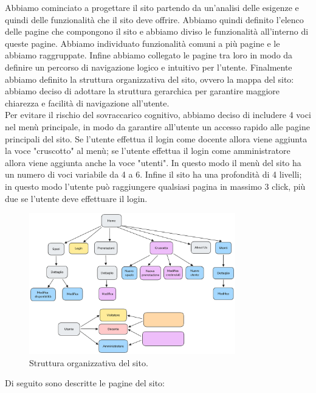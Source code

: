 Abbiamo cominciato a progettare il sito partendo da un'analisi delle esigenze e
quindi delle funzionalità che il sito deve offrire. Abbiamo quindi definito
l'elenco delle pagine che compongono il sito e abbiamo diviso le funzionalità
all'interno di queste pagine.
Abbiamo individuato funzionalità comuni a più pagine e le abbiamo raggruppate.
Infine abbiamo collegato le pagine tra loro in modo da definire un percorso
di navigazione logico e intuitivo per l'utente.
Finalmente abbiamo definito la struttura organizzativa del sito, ovvero la
mappa del sito: abbiamo deciso di adottare la struttura gerarchica per garantire
maggiore chiarezza e facilità di navigazione all'utente.\\
Per evitare il rischio del sovraccarico cognitivo, abbiamo deciso di includere 4
voci nel menù principale, in modo da garantire all'utente un accesso rapido alle
pagine principali del sito. Se l'utente effettua il login come docente allora
viene aggiunta la voce "cruscotto" al menù; se l'utente effettua il login come
amministratore allora viene aggiunta anche la voce "utenti". In questo modo il
menù del sito ha un numero di voci variabile da 4 a 6. Infine il sito ha una
profondità di 4 livelli; in questo modo l'utente può raggiungere qualsiasi
pagina in massimo 3 click, più due se l'utente deve effettuare il login.

\begin{figure}[h]
	\centering
	\includegraphics[width=0.8\textwidth]{figures/sitemap.png}
	\caption{Struttura organizzativa del sito.}
\end{figure}

Di seguito sono descritte le pagine del sito:

